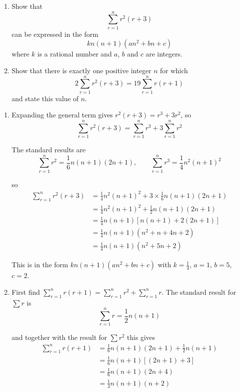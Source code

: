 \documentclass[leqno]{article}
\begin{document}
\begin{enumerate}[
  label=\textbf{\arabic*.},
  leftmargin=*,
  topsep=0pt,
  partopsep=0pt,
  parsep=0pt
]
\newpage

\questionitem

\begin{enumerate}[label=\textbf{(\alph*)}]
  \item Show that
  \[\sum_{r=1}^{n} r^2(r+3)\]
  can be expressed in the form
  \[kn(n+1)(an^2+bn+c)\]
  where $k$ is a rational number and $a$, $b$ and $c$ are integers.  \\
  \item Show that there is exactly one positive integer $n$ for which
  \[2\sum_{r=1}^{n} r^2(r+3) = 19\sum_{r=1}^{n} r(r+1)\]
  and state this value of $n$.  \\
\end{enumerate}

\vspace*{10pt}

\begin{djsSolution}
\begin{enumerate}[label=\textbf{(\alph*)}, start=1]
  \item Expanding the general term gives \(r^2(r+3)=r^3+3r^2\), so
\[
\sum_{r=1}^{n} r^2(r+3)=\sum_{r=1}^{n} r^3+3\sum_{r=1}^{n} r^2
\]

The standard results are
\[
\sum_{r=1}^{n} r^2=\frac16 n(n+1)(2n+1),\qquad \sum_{r=1}^{n} r^3=\frac14 n^2(n+1)^2
\]

so
\begin{align*}
\sum_{r=1}^{n} r^2(r+3)&=\frac14 n^2(n+1)^2+3\times\frac16 n(n+1)(2n+1)\\
&=\frac14 n^2(n+1)^2+\frac12 n(n+1)(2n+1)\\
&=\frac14 n(n+1)\left[n(n+1)+2(2n+1)\right]\\
&=\frac14 n(n+1)\left(n^2+n+4n+2\right)\\
&=\frac14 n(n+1)\left(n^2+5n+2\right)
\end{align*}

This is in the form \(kn(n+1)(an^2+bn+c)\) with \(k=\frac14\), \(a=1\), \(b=5\), \(c=2\).

  \item First find \(\sum_{r=1}^{n} r(r+1)=\sum_{r=1}^{n} r^2+\sum_{r=1}^{n} r\). The standard result for \(\sum r\) is
\[
\sum_{r=1}^{n} r=\frac12 n(n+1)
\]

and together with the result for \(\sum r^2\) this gives
\begin{align*}
\sum_{r=1}^{n} r(r+1)&=\frac16 n(n+1)(2n+1)+\frac12 n(n+1)\\
&=\frac16 n(n+1)\left[(2n+1)+3\right]\\
&=\frac16 n(n+1)(2n+4)\\
&=\frac13 n(n+1)(n+2)
\end{align*}


\end{enumerate}
\end{djsSolution}
\end{enumerate}
\end{document}
